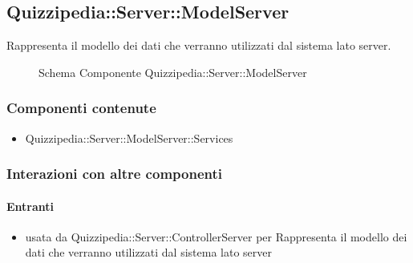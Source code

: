 \subsection{Quizzipedia::Server::ModelServer}
Rappresenta il modello dei dati che verranno utilizzati dal sistema lato server.
\begin{figure}[H]
\centering
\noindent{}
\caption[Schema Componente Quizzipedia::Server::ModelServer]{Schema Componente Quizzipedia::Server::ModelServer}
\end{figure}
\subsubsection{Componenti contenute}
\begin{itemize}
\item Quizzipedia::Server::ModelServer::Services
\end{itemize}
\subsubsection{Interazioni con altre componenti}
\paragraph{Entranti}
\begin{itemize}
\item usata da Quizzipedia::Server::ControllerServer per Rappresenta il modello dei dati che verranno utilizzati dal sistema lato server
\end{itemize}
